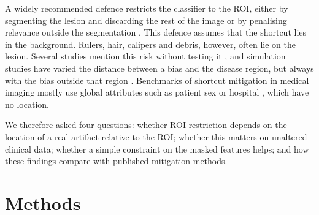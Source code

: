 \documentclass[12pt]{article}
\begin{document}
A widely recommended defence restricts the classifier to the ROI, either by segmenting the lesion and discarding the rest
of the image or by penalising relevance outside the segmentation \cite{maron2021confounding,bassi2024isnet}. This
defence assumes that the shortcut lies in the background. Rulers, hair, calipers and debris, however, often lie on the
lesion. Several studies mention this risk without testing it
\cite{maron2021confounding,viviano2021saliency,benahmed2022multisite,pahde2025ensuring}, and simulation studies have varied
the distance between a bias and the disease region, but always with the bias outside that region
\cite{stanley2023framework,stanley2024simba}. Benchmarks of shortcut mitigation in medical imaging mostly use global
attributes such as patient sex or hospital \cite{mueller2026shortcut,viviano2021saliency}, which have no location.

We therefore asked four questions: whether ROI restriction depends on the location of a real artifact relative to the
ROI; whether this matters on unaltered clinical data; whether a simple constraint on the masked features helps; and how
these findings compare with published mitigation methods.

\section*{Methods}
\end{document}
